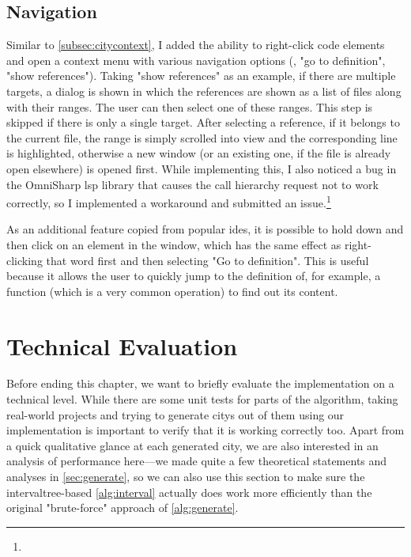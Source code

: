 \documentclass[../thesis]{subfiles}
\begin{document}
\subsection{Navigation}
Similar to \cref{subsec:citycontext}, I added the ability to right-click code elements and open a context menu with various navigation options (\eg, "go to definition", "show references").
Taking "show references" as an example, if there are multiple targets, a dialog is shown in which the references are shown as a list of files along with their ranges.
The user can then select one of these ranges.
This step is skipped if there is only a single target.
After selecting a reference, if it belongs to the current file, the range is simply scrolled into view and the corresponding line is highlighted, otherwise a new \gls{window} (or an existing one, if the file is already open elsewhere) is opened first.
While implementing this, I also noticed a bug in the OmniSharp \gls{lsp} library that causes the call hierarchy request not to work correctly, so I implemented a workaround and submitted an issue.\footnote{
}

As an additional feature copied from popular \glspl{ide}, it is possible to hold down  and then click on an element in the \gls{window}, which has the same effect as right-clicking that word first and then selecting "Go to definition".
This is useful because it allows the user to quickly jump to the definition of, for example, a function (which is a very common operation) to find out its content.

\section{Technical Evaluation}\label{sec:techeval}
Before ending this chapter, we want to briefly evaluate the implementation on a technical level.
While there are some unit tests for parts of the algorithm, taking real-world projects and trying to generate \glspl{city} out of them using our implementation is important to verify that it is working correctly too.
Apart from a quick qualitative glance at each generated city, we are also interested in an analysis of performance here---we made quite a few theoretical statements and analyses in \cref{sec:generate}, so we can also use this section to make sure the \gls{intervaltree}-based \cref{alg:interval} actually does work more efficiently than the original "brute-force" approach of \cref{alg:generate}.
\end{document}

